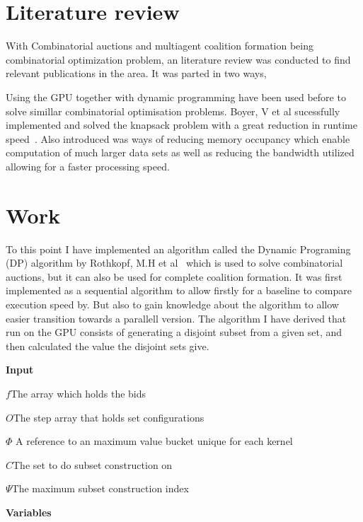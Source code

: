 \documentclass[a4paper, 12pt]{report}
\begin{document}
\section{Literature review}
With Combinatorial auctions and multiagent coalition formation being combinatorial optimization problem, an literature review was conducted to find relevant publications in the area. It was parted in two ways, 

Using the GPU together with dynamic programming have been used before to solve simillar combinatorial optimisation problems. Boyer, V et al sucessfully implemented and solved the knapsack problem with a great reduction in runtime speed~\cite{boyer2012solving}. Also introduced was ways of reducing memory occupancy which enable computation of much larger data sets as well as reducing the bandwidth utilized allowing for a faster processing speed.


\section{Work}

To this point I have implemented an algorithm called the Dynamic Programing (DP) algorithm by Rothkopf, M.H et al~\cite{rothkopf1998computationally} which is used to solve combinatorial auctions, but it can also be used for complete coalition formation. It was first implemented as a sequential algorithm to allow firstly for a baseline to compare execution speed by. But also to gain knowledge about the algorithm to allow easier transition towards a parallell version. The algorithm I have derived that run on the GPU consists of generating a disjoint subset from a given set, and then calculated the value the disjoint sets give.

\thispagestyle{empty}

\thispagestyle{empty}
\pagestyle{empty}
\textbf{Input}

$f$\hfill The array which holds the bids

$O$\hfill The step array that holds set configurations

$ \Phi $ \hfill A reference to an maximum value bucket unique for each kernel

$C$\hfill The set to do subset construction on

$\Psi$\hfill The maximum subset construction index


\textbf{Variables} 
\end{document}
